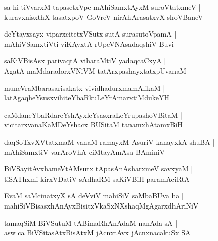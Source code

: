 \begin{shloka}
sa hi tiVvarxM tapasetxVpe mAhiSamxtAyxM suroVtatxmeV |\\
kuravxnisxthX tasatxpoV GoVreV nirAhArasatxvX shoVBaneV 
\end{shloka}

\begin{shloka}
deYtayxsayx viparxcitetxVSutx sutA surasutoVpamA |\\
mAhiVSamxtiVti viKAyxtA rUpeVNAsadaqshiV Buvi
\end{shloka}

\begin{shloka}
saKiVBisAsx parivaqtA viharaMtiV yadaqcaCxyA |\\
AgatA maMdaradorxVNiVM tatArxpashayxtatxpUvanaM 
\end{shloka}

\begin{shloka}
muneVraMbarasarisakatx vividhadurxmamAlikaM |\\
latAgaqheYsusxvihiteYbaRkuLeYrAmarxtiMdukeYH 
\end{shloka}

\begin{shloka}
caMdaneYbaRdareYshAyxleYsasxraLeYrupashoVBitaM |\\
vicitarxvanaKaMDeYshacx BUSitaM tanamxhAtamxBiH
\end{shloka}

\begin{shloka}
daqSoTxvXVtatxmaM vanaM ramayxM AsuriV kanayxkA shuBA |\\
mAhiSamxtiV varAroVhA ciMtayAmAsa BAminiV 
\end{shloka}

\begin{shloka}
BiVSayitAvxhameVtAMsutx tApasAnAsharxmeV savxyaM |\\
tiSAThxmi kirxVDatiV sAdhaRM saKiVBiH paramAciRtA 
\end{shloka}

\begin{shloka}
EvaM saMcinatxyX sA deVviV mahiSiV saMbaBUva ha |\\
mahiSiVBisasxhAnAyxBisitxVkaSxNXshaqMgAgarxdhAriNiV 
\end{shloka}

\begin{shloka}
tamaqSiM BiVSutuM tABimaRhAnAdaM nanAda sA |\\
asw ca BiVSitasAtxBisAtxM jAcnxtAvx jAcnxnacakuSx SA
\end{shloka}

